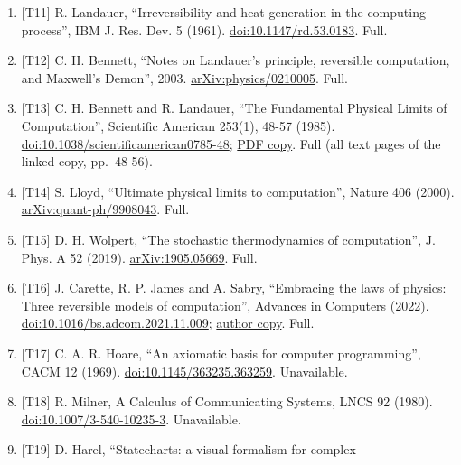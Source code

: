 \documentclass[10pt,letterpaper]{article}
\begin{document}
\begin{enumerate}
  Bell System Technical Journal 27 (1948).
  \href{https://doi.org/10.1002/j.1538-7305.1948.tb01338.x}{doi:10.1002/j.1538-7305.1948.tb01338.x};
  \href{https://people.math.harvard.edu/~ctm/home/text/others/shannon/entropy/entropy.pdf}{reprint}
  (page numbers refer to this reprint). Full (all 55 pp.~of the reprint,
  Parts I to V and Appendices 1 to 7).
\item
  {[}T11{]} R. Landauer, ``Irreversibility and heat generation in the
  computing process'', IBM J. Res. Dev. 5 (1961).
  \href{https://doi.org/10.1147/rd.53.0183}{doi:10.1147/rd.53.0183}.
  Full.
\item
  {[}T12{]} C. H. Bennett, ``Notes on Landauer's principle, reversible
  computation, and Maxwell's Demon'', 2003.
  \href{https://arxiv.org/abs/physics/0210005}{arXiv:physics/0210005}.
  Full.
\item
  {[}T13{]} C. H. Bennett and R. Landauer, ``The Fundamental Physical
  Limits of Computation'', Scientific American 253(1), 48-57 (1985).
  \href{https://doi.org/10.1038/scientificamerican0785-48}{doi:10.1038/scientificamerican0785-48};
  \href{http://physics.bu.edu/~pankajm/PY541/Bennett-Landauer.pdf}{PDF
  copy}. Full (all text pages of the linked copy, pp.~48-56).
\item
  {[}T14{]} S. Lloyd, ``Ultimate physical limits to computation'',
  Nature 406 (2000).
  \href{https://arxiv.org/abs/quant-ph/9908043}{arXiv:quant-ph/9908043}.
  Full.
\item
  {[}T15{]} D. H. Wolpert, ``The stochastic thermodynamics of
  computation'', J. Phys. A 52 (2019).
  \href{https://arxiv.org/abs/1905.05669}{arXiv:1905.05669}. Full.
\item
  {[}T16{]} J. Carette, R. P. James and A. Sabry, ``Embracing the laws
  of physics: Three reversible models of computation'', Advances in
  Computers (2022).
  \href{https://doi.org/10.1016/bs.adcom.2021.11.009}{doi:10.1016/bs.adcom.2021.11.009};
  \href{https://www.cas.mcmaster.ca/~carette/publications/EmbracingTheLaws.pdf}{author
  copy}. Full.
\item
  {[}T17{]} C. A. R. Hoare, ``An axiomatic basis for computer
  programming'', CACM 12 (1969).
  \href{https://doi.org/10.1145/363235.363259}{doi:10.1145/363235.363259}.
  Unavailable.
\item
  {[}T18{]} R. Milner, A Calculus of Communicating Systems, LNCS 92
  (1980).
  \href{https://doi.org/10.1007/3-540-10235-3}{doi:10.1007/3-540-10235-3}.
  Unavailable.
\item
  {[}T19{]} D. Harel, ``Statecharts: a visual formalism for complex

\end{enumerate}
\end{document}
